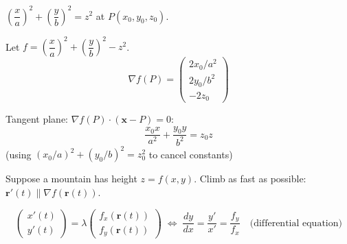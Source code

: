 \begin{example}
  $\left(\dfrac{x}{a}\right)^{2}+\left(\dfrac{y}{b}\right)^{2}=z^{2}$
  at $P(x_{0},y_{0},z_{0})$.

  Let $f=\left(\dfrac{x}{a}\right)^{2}+\left(\dfrac{y}{b}\right)^{2}-z^{2}$.
  \[
    \nabla f(P)
    =
    \begin{pmatrix}
      2x_{0}/a^{2} \\2y_{0}/b^{2}\\-2z_{0}
    \end{pmatrix}
  \]

  Tangent plane: $\nabla f(P)\cdot(\mathbf{x}-P)=0$:
  \[
    \frac{x_{0}x}{a^{2}}+\frac{y_{0}y}{b^{2}}=z_{0}z
  \]
  (using $(x_{0}/a)^{2}+(y_{0}/b)^{2}=z_{0}^{2}$ to cancel constants)
\end{example}

\begin{example}
  Suppose a mountain has height $z=f(x,y)$.
  Climb as fast as possible: $\mathbf{r}'(t)\parallel\nabla f(\mathbf{r}(t))$.

  \begin{center}
  \end{center}

  \[
    \begin{pmatrix}
      x'(t) \\y'(t)
    \end{pmatrix}
    = \lambda
    \begin{pmatrix}
      f_{x}(\mathbf{r}(t)) \\f_{y}(\mathbf{r}(t))
    \end{pmatrix}
    \;\Longleftrightarrow\;
    \frac{dy}{dx}=\frac{y'}{x'}=\frac{f_{y}}{f_{x}}
    \quad\text{(differential equation)}
  \]
\end{example}

